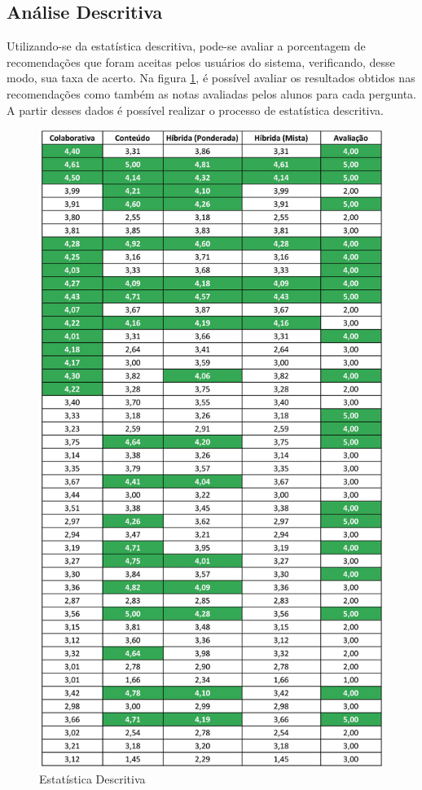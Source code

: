 \subsection{Análise Descritiva}

Utilizando-se da estatística descritiva, pode-se avaliar a porcentagem de recomendações que foram aceitas pelos usuários do sistema, verificando, desse modo, sua taxa de acerto. Na figura \ref{fig:analiseDescritiva}, é possível avaliar os resultados obtidos nas recomendações como também as notas avaliadas pelos alunos para cada pergunta. A partir desses dados é possível realizar o processo de estatística descritiva.

\begin{figure}[H]
	\centering
	\includegraphics[width=0.8\linewidth]{imagens/estatisticaDescritiva.jpg}
	\caption[Estatística Descritiva]{Estatística Descritiva}
    \label{fig:analiseDescritiva}
\end{figure}

